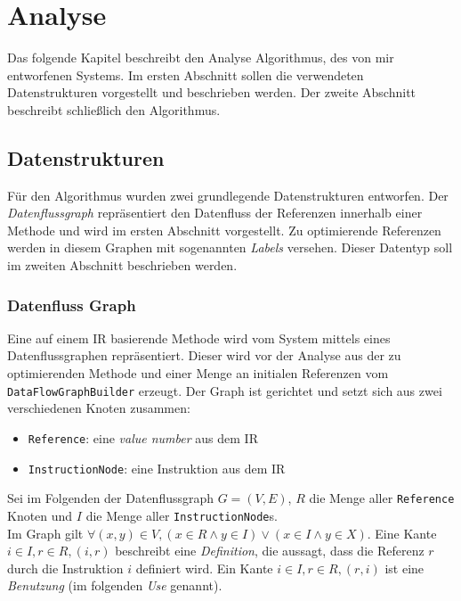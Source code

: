 \chapter{Analyse}

Das folgende Kapitel beschreibt den Analyse Algorithmus, des von mir entworfenen Systems.
Im ersten Abschnitt sollen die verwendeten Datenstrukturen vorgestellt und beschrieben werden.
Der zweite Abschnitt beschreibt schließlich den Algorithmus.

\section{Datenstrukturen}

Für den Algorithmus wurden zwei grundlegende Datenstrukturen entworfen. Der 
\textit{Datenflussgraph} repräsentiert den Datenfluss der Referenzen innerhalb 
einer Methode und wird im ersten Abschnitt vorgestellt. Zu optimierende Referenzen
werden in diesem Graphen mit sogenannten \textit{Labels} versehen. Dieser Datentyp
soll im zweiten Abschnitt beschrieben werden.

\subsection{Datenfluss Graph}\label{ssec:DFG}

Eine auf einem IR basierende Methode wird vom System mittels eines Datenflussgraphen 
repräsentiert. Dieser wird vor der Analyse aus der zu optimierenden
Methode und einer Menge an initialen Referenzen vom \\\texttt{DataFlowGraphBuilder}
erzeugt. Der Graph ist gerichtet und setzt sich aus zwei verschiedenen Knoten zusammen:

\begin{itemize}
	\item \texttt{Reference}: eine \textit{value number} aus dem IR
	\item \texttt{InstructionNode}: eine Instruktion aus dem IR
\end{itemize}

Sei im Folgenden der Datenflussgraph $G = (V, E)$, $R$ die Menge aller \texttt{Reference} 
Knoten und $I$ die Menge aller \texttt{InstructionNode}s. 
\\
Im Graph gilt $\forall (x, y) \in V,  (x \in R \wedge y \in I) \vee (x \in I \wedge y \in X)$.
Eine Kante $i \in I, r \in R, (i, r)$ beschreibt eine \textit{Definition}, die aussagt, 
dass die Referenz $r$ durch die Instruktion $i$ definiert wird. Ein Kante 
$i \in I, r \in R, (r, i)$ ist eine \textit{Benutzung} (im folgenden \textit{Use}
genannt). 

